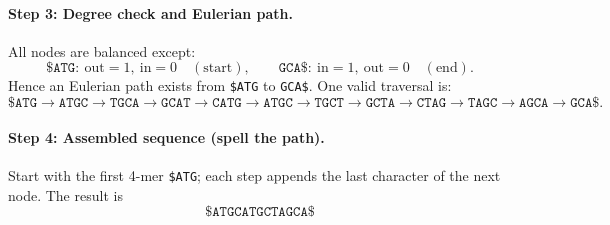 \paragraph{Step 3: Degree check and Eulerian path.}
All nodes are balanced except:
\[
    \texttt{\$ATG}:\ \text{out}=1,\ \text{in}=0\quad(\text{start}),\qquad
    \texttt{GCA\$}:\ \text{in}=1,\ \text{out}=0\quad(\text{end}).
\]
Hence an Eulerian path exists from \texttt{\$ATG} to \texttt{GCA\$}. One valid traversal is:
\[
    \texttt{\$ATG}\to\texttt{ATGC}\to\texttt{TGCA}\to\texttt{GCAT}\to\texttt{CATG}\to\texttt{ATGC}\to\texttt{TGCT}\to\texttt{GCTA}\to\texttt{CTAG}\to\texttt{TAGC}\to\texttt{AGCA}\to\texttt{GCA\$}.
\]

\paragraph{Step 4: Assembled sequence (spell the path).}
Start with the first 4-mer \texttt{\$ATG}; each step appends the last character of the next node. The result is
\[
    \boxed{\texttt{\$ATGCATGCTAGCA\$}}
\]

\bigskip


